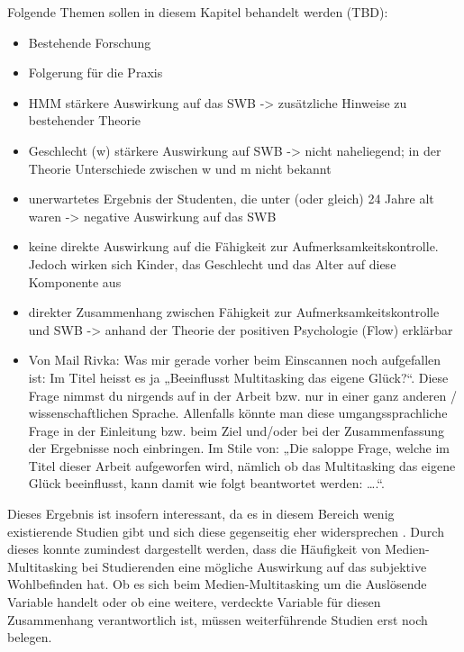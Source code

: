 Folgende Themen sollen in diesem Kapitel behandelt werden (TBD):
\begin{itemize}
    \item Bestehende Forschung
    \item Folgerung für die Praxis
    \item HMM stärkere Auswirkung auf das SWB -> zusätzliche Hinweise zu bestehender Theorie
    \item Geschlecht (w) stärkere Auswirkung auf SWB -> nicht naheliegend; in der Theorie Unterschiede zwischen w und m nicht bekannt
    \item unerwartetes Ergebnis der Studenten, die unter (oder gleich) 24 Jahre alt waren -> negative Auswirkung auf das SWB
    \item keine direkte Auswirkung auf die Fähigkeit zur Aufmerksamkeitskontrolle. Jedoch wirken sich Kinder, das Geschlecht und das Alter auf diese Komponente aus
    \item direkter Zusammenhang zwischen Fähigkeit zur Aufmerksamkeitskontrolle und SWB -> anhand der Theorie der positiven Psychologie (Flow) erklärbar
    \item Von Mail Rivka: Was mir gerade vorher beim Einscannen noch aufgefallen ist: Im Titel heisst es ja „Beeinflusst Multitasking das eigene Glück?“. Diese Frage nimmst du nirgends auf in der Arbeit bzw. nur in einer ganz anderen / wissenschaftlichen Sprache. Allenfalls könnte man diese umgangssprachliche Frage in der Einleitung bzw. beim Ziel und/oder bei der Zusammenfassung der Ergebnisse noch einbringen. Im Stile von: „Die saloppe Frage, welche im Titel dieser Arbeit aufgeworfen wird, nämlich ob das Multitasking das eigene Glück beeinflusst, kann damit wie folgt beantwortet werden: ….“.
\end{itemize}

 Dieses Ergebnis ist insofern interessant, da es in diesem Bereich wenig existierende Studien gibt und sich diese gegenseitig eher widersprechen \cite{Pea2012, Shih2013}. Durch dieses konnte zumindest dargestellt werden, dass die Häufigkeit von Medien-Multitasking bei Studierenden eine mögliche Auswirkung auf das subjektive Wohlbefinden hat. Ob es sich beim Medien-Multitasking um die Auslösende Variable handelt oder ob eine weitere, verdeckte Variable für diesen Zusammenhang verantwortlich ist, müssen weiterführende Studien erst noch belegen. 
